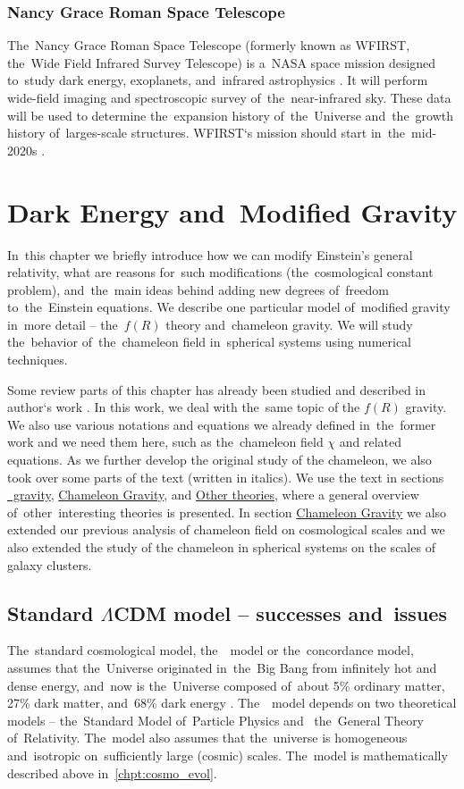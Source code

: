 \subsection{Nancy Grace Roman Space Telescope}
The~Nancy Grace Roman Space Telescope (formerly known as WFIRST, the~Wide Field Infrared Survey Telescope) is a~NASA space mission designed to~study dark energy, exoplanets, and~infrared astrophysics \parencite{wmap_web}. It will perform wide-field imaging and spectroscopic survey of~the~near-infrared sky. These data will be used to determine the~expansion history of~the~Universe and~the~growth history of~larges-scale structures. WFIRST`s mission should start in~the~mid-2020s \parencite{WFIRST_report}.
 \clearpage{}
\clearpage{}\chapter{Dark Energy and~Modified Gravity}
\label{chpt:de_mg}
In~this chapter we briefly introduce how we can modify Einstein's general relativity, what are reasons for~such modifications (the~cosmological constant problem), and~the~main ideas behind adding new degrees of~freedom to~the~Einstein equations. We describe one particular model of~modified gravity in~more detail -- the~$f(R)$ theory and~chameleon gravity. We will study the~behavior of~the~chameleon field in~spherical systems using numerical techniques.

Some review parts of this chapter has already been studied and described in author`s work \textcite{mastersthesis_vrastil}. In this work, we deal with the~same topic of the $f(R)$ gravity. We also use various notations and equations we already defined in~the~former work and we need them here, such as the~chameleon field $\chi$ and related equations. As we further develop the original study of the chameleon, we also took over some parts of the text (written in italics). We use the text in sections \hyperref[sec:fR]{\fR\ gravity}, \hyperref[sec_cham]{Chameleon Gravity}, and \hyperref[sec:other]{Other theories}, where a general overview of~other~interesting theories is presented. In section \hyperref[sec_cham]{Chameleon Gravity} we also extended our previous analysis of chameleon field on cosmological scales and we also extended the study of the chameleon in spherical systems on the scales of galaxy clusters.

\section{Standard $\Lambda$CDM model -- successes and~issues}
The~standard cosmological model, the~\LCDM\ model or the~concordance model, assumes that the~Universe originated in~the~Big Bang from infinitely hot and dense energy, and~now is the~Universe composed of~about 5\% ordinary matter, 27\% dark matter, and~68\% dark energy \parencite{redefineLCDM}. The~\LCDM\ model depends on two theoretical models -- the~Standard Model of~Particle Physics and~ the~General Theory of~Relativity. The~model also assumes that the~universe is homogeneous and~isotropic on~sufficiently large (cosmic) scales. The~model is mathematically described above in~\autoref{chpt:cosmo_evol}.

